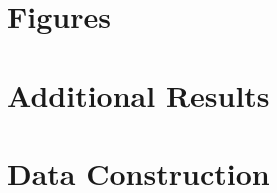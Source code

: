 \documentclass[12pt]{article}
\begin{document}
\clearpage

\section*{Figures}



\clearpage
\begin{appendices}
\onehalfspacing

\section{Additional Results}
\label{appendix:A}

\section{Data Construction}
\label{appendix:B}

\end{appendices}
\end{document}
